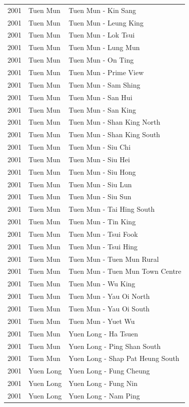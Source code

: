\begin{longtable}{p{1.2cm}p{3cm}p{7cm}}
2001 & Tuen Mun & Tuen Mun - Kin Sang \\
2001 & Tuen Mun & Tuen Mun - Leung King \\
2001 & Tuen Mun & Tuen Mun - Lok Tsui \\
2001 & Tuen Mun & Tuen Mun - Lung Mun \\
2001 & Tuen Mun & Tuen Mun - On Ting \\
2001 & Tuen Mun & Tuen Mun - Prime View \\
2001 & Tuen Mun & Tuen Mun - Sam Shing \\
2001 & Tuen Mun & Tuen Mun - San Hui \\
2001 & Tuen Mun & Tuen Mun - San King \\
2001 & Tuen Mun & Tuen Mun - Shan King North \\
2001 & Tuen Mun & Tuen Mun - Shan King South \\
2001 & Tuen Mun & Tuen Mun - Siu Chi \\
2001 & Tuen Mun & Tuen Mun - Siu Hei \\
2001 & Tuen Mun & Tuen Mun - Siu Hong \\
2001 & Tuen Mun & Tuen Mun - Siu Lun \\
2001 & Tuen Mun & Tuen Mun - Siu Sun \\
2001 & Tuen Mun & Tuen Mun - Tai Hing South \\
2001 & Tuen Mun & Tuen Mun - Tin King \\
2001 & Tuen Mun & Tuen Mun - Tsui Fook \\
2001 & Tuen Mun & Tuen Mun - Tsui Hing \\
2001 & Tuen Mun & Tuen Mun - Tuen Mun Rural \\
2001 & Tuen Mun & Tuen Mun - Tuen Mun Town Centre \\
2001 & Tuen Mun & Tuen Mun - Wu King \\
2001 & Tuen Mun & Tuen Mun - Yau Oi North \\
2001 & Tuen Mun & Tuen Mun - Yau Oi South \\
2001 & Tuen Mun & Tuen Mun - Yuet Wu \\
2001 & Tuen Mun & Yuen Long - Ha Tsuen \\
2001 & Tuen Mun & Yuen Long - Ping Shan South \\
2001 & Tuen Mun & Yuen Long - Shap Pat Heung South \\
2001 & Yuen Long & Yuen Long - Fung Cheung \\
2001 & Yuen Long & Yuen Long - Fung Nin \\
2001 & Yuen Long & Yuen Long - Nam Ping \\

\end{longtable}
